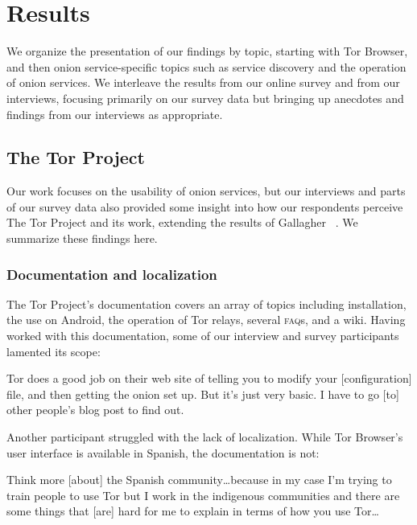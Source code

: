 \section{Results}
\label{sec:results}

We organize the presentation of our findings by topic, starting with Tor
Browser, and then onion service-specific topics such as service discovery and
the operation of onion services.  We interleave the results from our online
survey and from our interviews, focusing primarily on our survey data but
bringing up anecdotes and findings from our interviews as appropriate.

\subsection{The Tor Project}

Our work focuses on the usability of onion services, but our interviews and
parts of our survey data also provided some insight into how our respondents
perceive The Tor Project and its work, extending the results of Gallagher
\ea~\cite{Gallagher2017a}.  We summarize these findings here.

\subsubsection{Documentation and localization}

The Tor Project's documentation covers an array of topics including
installation, the use on Android, the operation of Tor relays, several
\textsc{faq}s, and a wiki.  Having worked with this documentation, some of our
interview and survey participants lamented its scope:

\begin{displayquote}[P14]
Tor does a good job on their web site of telling you to modify your
[configuration] file, and then getting the onion set up.  But it's just very
basic.  I have to go [to] other people's blog post to find out.
\end{displayquote}

Another participant struggled with the lack of localization.  While Tor
Browser's user interface is available in Spanish, the documentation is not:

\begin{displayquote}[P11]
Think more [about] the Spanish community\dots because in my case I'm trying to
train people to use Tor but I work in the indigenous communities and there are
some things that [are] hard for me to explain in terms of how you use Tor\dots
\end{displayquote}

